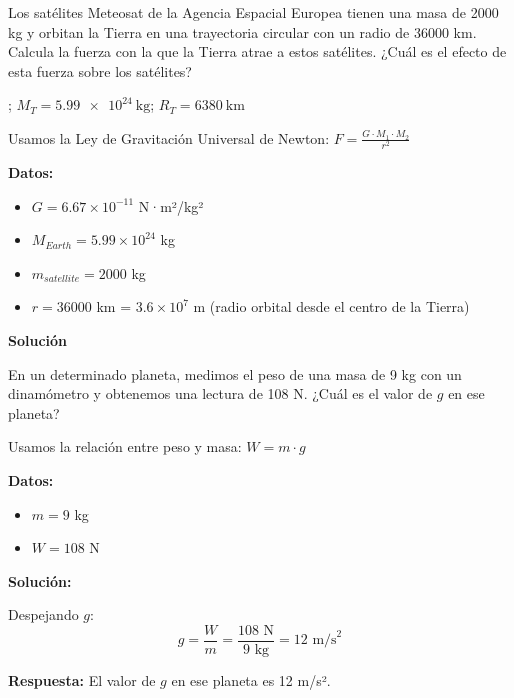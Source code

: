\begin{exercise}
    Los satélites Meteosat de la Agencia Espacial Europea tienen una masa de 2000 kg y orbitan la Tierra en una trayectoria circular con un radio de 36000 km.
    Calcula la fuerza con la que la Tierra atrae a estos satélites.
    ¿Cuál es el efecto de esta fuerza sobre los satélites?

    \datos{} \Ggravitacion; \( M_T = \qty{5.99e24}{\kilo\g} \); \( R_T = \qty{6380}{\kilo\metre} \)

    \begin{solu}
        Usamos la Ley de Gravitación Universal de Newton: $F = \frac{G \cdot M_1 \cdot M_2}{r^2}$

        \textbf{Datos:}
        \begin{itemize}
            \item $G = 6.67 \times 10^{-11}$ N·m²/kg²
            \item $M_{Earth} = 5.99 \times 10^{24}$ kg
            \item $m_{satellite} = 2000$ kg
            \item $r = 36000$ km = $3.6 \times 10^7$ m (radio orbital desde el centro de la Tierra)
        \end{itemize}

        \textbf{Solución}
    \end{solu}
\end{exercise}



\begin{exercise}
    En un determinado planeta, medimos el peso de una masa de 9 kg con un dinamómetro y obtenemos una lectura de 108 N. ¿Cuál es el valor de \( g \) en ese planeta?
    \begin{solu}
        Usamos la relación entre peso y masa: $W = m \cdot g$

        \textbf{Datos:}
        \begin{itemize}
            \item $m = 9$ kg
            \item $W = 108$ N
        \end{itemize}

        \textbf{Solución:}

        Despejando $g$:
        $$g = \frac{W}{m} = \frac{108\text{ N}}{9\text{ kg}} = 12\text{ m/s}^2$$

        \textbf{Respuesta:} El valor de $g$ en ese planeta es 12 m/s².
    \end{solu}
\end{exercise}

